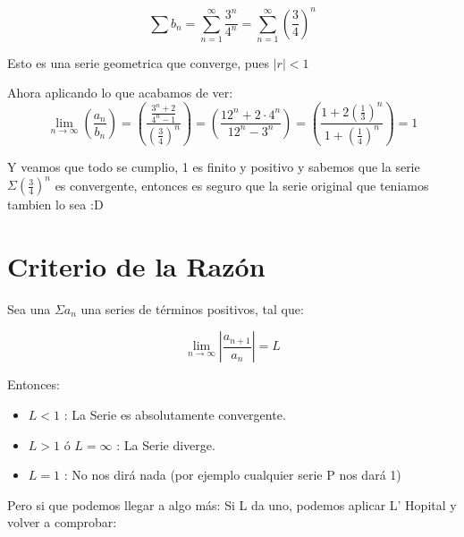 \documentclass[12pt]{report}                                %
\begin{document}
            \begin{equation*}
                \sum b_n = \sum_{n=1}^{\infty} \frac{3^n}{4^n} = \sum_{n=1}^{\infty} \left( \frac{3}{4} \right)^n 
            \end{equation*}

            Esto es una serie geometrica que converge, pues $|r| < 1$

            Ahora aplicando lo que acabamos de ver:
            \begin{equation*}
                \lim_{n \to \infty} \left( \frac{a_n}{b_n} \right) = \left( \frac{ \frac{3^n+2}{4^n-1} }{ \left( \frac{3}{4} \right)^n  } \right) =  \left( \frac{12^n + 2 \cdot 4^n}{12^n -3^n} \right) = \left( \frac{1 + 2 (\frac{1}{3})^n}{1 +  (\frac{1}{4})^n} \right) = 1
            \end{equation*}

            Y veamos que todo se cumplio, 1 es finito y positivo y sabemos que la serie $\Sigma (\frac{3}{4})^n$ es convergente, entonces es seguro que la serie original que teniamos tambien lo sea :D


    \clearpage
    \section{Criterio de la Razón}

        Sea una $\Sigma a_n$ una series de términos positivos, tal que:

        \begin{equation}
            \lim_{n \to \infty} \left| \frac{a_{n+1}}{a_n} \right| = L
        \end{equation}

        Entonces:
        \begin{itemize}
            \item $L < 1$ : La Serie es absolutamente convergente.
            \item $L > 1$ ó $L = \infty$ : La Serie diverge.
            \item $L = 1$ : No nos dirá nada (por ejemplo cualquier serie P nos dará 1)
        \end{itemize}

        Pero si que podemos llegar a algo más:
        Si L da uno, podemos aplicar L' Hopital y volver a comprobar:
\end{document}
